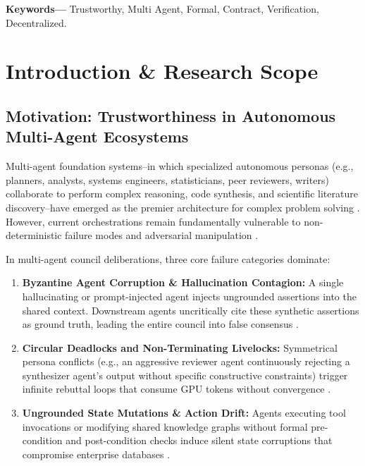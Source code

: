 \documentclass[10pt,twocolumn,letterpaper]{article}
\begin{document}
\noindent\textbf{Keywords---} Trustworthy, Multi Agent, Formal, Contract, Verification, Decentralized.







\section{Introduction \& Research Scope}



\subsection{Motivation: Trustworthiness in Autonomous Multi-Agent Ecosystems}


Multi-agent foundation systems--in which specialized autonomous personas (e.g., planners, analysts, systems engineers, statisticians, peer reviewers, writers) collaborate to perform complex reasoning, code synthesis, and scientific literature discovery--have emerged as the premier architecture for complex problem solving \cite{arxiv_2005_14165,arxiv_2405_01543}. However, current orchestrations remain fundamentally vulnerable to non-deterministic failure modes and adversarial manipulation \cite{arxiv_2312_03893}.

In multi-agent council deliberations, three core failure categories dominate:
\begin{enumerate}
  \item \textbf{Byzantine Agent Corruption \& Hallucination Contagion:} A single hallucinating or prompt-injected agent injects ungrounded assertions into the shared context. Downstream agents uncritically cite these synthetic assertions as ground truth, leading the entire council into false consensus \cite{arxiv_2406_00584}.
  \item \textbf{Circular Deadlocks and Non-Terminating Livelocks:} Symmetrical persona conflicts (e.g., an aggressive reviewer agent continuously rejecting a synthesizer agent's output without specific constructive constraints) trigger infinite rebuttal loops that consume GPU tokens without convergence \cite{arxiv_2501_02497}.
  \item \textbf{Ungrounded State Mutations \& Action Drift:} Agents executing tool invocations or modifying shared knowledge graphs without formal pre-condition and post-condition checks induce silent state corruptions that compromise enterprise databases \cite{arxiv_2404_04289}.
\end{enumerate}
\end{document}
